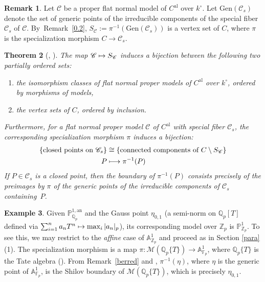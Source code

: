 \documentclass[JEP,XML,SOM,Unicode,NoFloatCountersInSection,published]{cedram}
\newcommand{\mto}{\mathchoice{\longmapsto}{\mapsto}{\mapsto}{\mapsto}}
\newcommand{\al}{\mathrm{al}}
\let\backslash\setminus
\newtheorem{thm}{Theorem}[section]
\theoremstyle{definition}
\newtheorem{rem}[thm]{Remark}
\newtheorem{ex}[thm]{Example}
\begin{document}
\begin{rem} \label{psejo} Let $\mathscr{C}$ be a proper flat normal model of $C^{\al}$ over $k^{\circ}$. Let $\mathrm{Gen}(\mathscr{C}_s)$ denote the set of generic points of the irreducible components of the special fiber~$\mathscr{C}_s$ of $\mathscr{C}$. By~Remark~\ref{0.2}, $S_{\mathscr{C}}:=\pi^{-1}(\mathrm{Gen}(\mathscr{C}_s))$ is a vertex set of $C$, where $\pi$ is the specialization morphism ${C \to \mathscr{C}_s}$.
\end{rem}
\begin{thm}[{\cite[Th.\,4.3]{lordan}, \cite[6.3.14]{duc}}] \label{lordan}
The map $\mathscr{C} \mto S_{\mathscr{C}}$ induces a bijection between the following two partially ordered sets:
\begin{enumerate}
\item the isomorphism classes of flat normal proper models of $C^{\al}$ over $k^{\circ}$, ordered by morphisms of models,
\item the vertex sets of $C$, ordered by inclusion.
\end{enumerate}
Furthermore, for a flat normal proper model $\mathscr{C}$ of $C^{\al}$ with special fiber $\mathscr{C}_s$, the corresponding specialization morphism $\pi$ induces a bijection:
\[
\begin{aligned}
\{\text{closed points on } \mathscr{C}_s\} & \cong \{\text{connected components of } C \backslash S_{\mathscr{C}}\} \\
P & \mto \pi^{-1}(P)
\end{aligned}
\]
If $P \in \mathscr{C}_s$ is a closed point, then the boundary of $\pi^{-1}(P)$ consists precisely of the preimages by $\pi$ of the generic points of the irreducible components of $\mathscr{C}_s$ containing~$P$.
\end{thm}

\begin{ex} \label{shembulli}
Given $\mathbb{P}_{\mathbb{Q}_p}^{1, \mathrm{an}}$ and the Gauss point $\eta_{0,1}$ (a semi-norm on $\mathbb{Q}_p[T]$ defined via $\sum_{i=1}^n a_n T^n \mto \max_i |a_n|_p$), its corresponding model over $\mathbb{Z}_p$ is $\mathbb{P}_{\mathbb{Z}_p}^1$. To see this, we may restrict to the \emph{affine} case of $\mathbb{A}_{\mathbb{Z}_p}^1$ and proceed as in Section \ref{para}(1). The specialization morphism is a map $\pi: \mathcal{M}(\mathbb{Q}_p\{T\}) \to \mathbb{A}_{\mathbb{F}_p}^1$, where $\mathbb{Q}_p\{T\}$ is the Tate algebra \hbox{(\cf \cite[2.1]{Ber90})}. From Remark~\ref{berred} and \cite[Prop.\,2.4.4]{Ber90}, $\pi^{-1}(\eta)$, where $\eta$ is the generic point of $\mathbb{A}_{\mathbb{F}_p}^1$, is the Shilov boundary of $\mathcal{M}(\mathbb{Q}_p\{T\})$, which is precisely $\eta_{0,1}$.
\end{ex}
\end{document}
